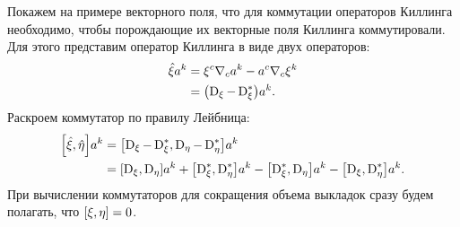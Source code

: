 \documentclass[12pt,a4paper]{article}
\begin{document}
                Покажем на примере векторного поля, что для коммутации операторов Киллинга необходимо, чтобы порождающие их векторные поля Киллинга коммутировали. Для этого представим оператор Киллинга в виде двух операторов:
                \begin{equation}\begin{aligned}
                    \hat{\mathbf{\xi}} a^k
                        &= \xi^c \nabla_c a^k - a^c \nabla_c \xi^k \\
                        &= \qty(\operatorname{D}_\xi - \operatorname{D}^{*}_\xi) a^k .
                \end{aligned}\end{equation}
                Раскроем коммутатор по правилу Лейбница:
                \begin{equation}\begin{aligned}
                    \comm{\Op{\xi}}{\Op{\eta}} a^k
                        &= \comm{\D_\xi - \D^{*}_\xi}{\D_\eta - \D^{*}_\eta} a^k \\
                        &= \comm{\D_\xi}{\D_\eta} a^k
                        + \comm{\D^{*}_\xi}{\D^{*}_\eta} a^k
                        - \comm{\D^{*}_\xi}{\D_\eta} a^k
                        - \comm{\D_\xi}{\D^{*}_\eta} a^k .
                \end{aligned}\end{equation}
                При вычислении коммутаторов для сокращения объема выкладок сразу будем полагать, что $\comm{\xi}{\eta} = 0$.
\end{document}
